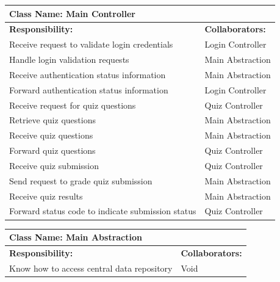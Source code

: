 \documentclass[]{article}
\begin{document}
	\begin{table}[H]
	\centering
		\begin{tabular}{|p{9cm}|p{3cm}|}
		\hline
		 \multicolumn{2}{|l|}{\textbf{Class Name: Main Controller}} \\
		\hline
		\textbf{Responsibility:} & \textbf{Collaborators:} \\
		\hline
	    Receive request to validate login credentials & Login Controller\\
		\hline
	    Handle login validation requests & Main Abstraction\\
		\hline
		Receive authentication status information & Main Abstraction\\
		\hline
		Forward authentication status information & Login Controller\\
		\hline
		Receive request for quiz questions & Quiz Controller\\
		\hline
		Retrieve quiz questions & Main Abstraction \\
		\hline
		Receive quiz questions & Main Abstraction\\
		\hline
		Forward quiz questions & Quiz Controller\\
		\hline
		Receive quiz submission & Quiz Controller\\
		\hline
		Send request to grade quiz submission & Main Abstraction\\
		\hline
		Receive quiz results & Main Abstraction\\
		\hline
		Forward status code to indicate submission status & Quiz Controller\\
		\hline
		\end{tabular}
	\end{table}
	
	\begin{table}[H]
	\centering
		\begin{tabular}{|p{9cm}|p{3cm}|}
		\hline
		 \multicolumn{2}{|l|}{\textbf{Class Name: Main Abstraction}} \\
		\hline
		\textbf{Responsibility:} & \textbf{Collaborators:} \\
		\hline
		Know how to access central data repository & Void\\
		\hline
		\end{tabular}
	\end{table}
	
\end{document}
